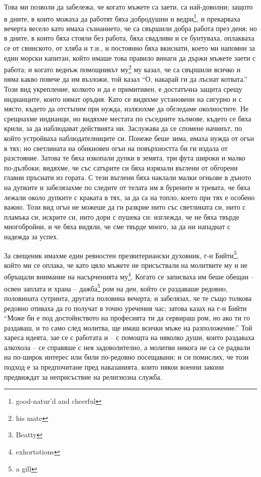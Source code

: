 \documentclass[12pt]{book}
\begin{document}
Това ми позволи да забележа, че когато мъжете са заети, са най-доволни; защото в дните, в които можаха да работят бяха добродушни и ведри\footnote{good-natur'd and cheerful}, и прекарваха вечерта весело като имаха съзнанието, че са свършили добра работа през деня; но в дните, в които бяха стояли без работа, бяха свадливи и се бунтуваха, оплакваха се от свинското, от хляба и т.н., и постоянно бяха вкиснати, което ми напомни за един морски капитан, който имаше това правило винаги да държи мъжете заети с работа; и когато веднъж помощникът му\footnote{his mate} му казал, че са свършили всичко и няма какво повече да им възложи, той казал “О, накарай ги да лъснат котвата.”  
Този вид укрепление, колкото и да е примитивен, е достатъчна защита срещу индианците, които нямат оръдия. Като се видяхме установени на сигурно и с място, където да отстъпим при нужда, излязохме да обгледаме околностите. Не срещнахме индианци, но видяхме местата по съседните хълмове, където се бяха крили, за да наблюдават действията ни. Заслужава да се спомене начинът, по който устройваха наблюдателниците си. Понеже беше зима, имаха нужда от огън в тях; но светлината на обикновен огън на повърхността би ги издала от разстояние. Затова те бяха изкопали дупки в земята, три фута широки и малко по-дълбоки; видяхме, че със сатърите си бяха изрязали въглени от обгорени главни пръснати из гората. С тези въглени бяха наклали малки огньове в дъното на дупките и забелязахме по следите от телата им в бурените и тревата, че бяха лежали около дупките с краката в тях, за да са на топло, което при тях е особено важно. Този вид огън не можеше да ги разкрие нито със светлината си, нито с пламъка си, искрите си, нито дори с пушека си: изглежда, че не бяха твърде многобройни, и че бяха видяли, че сме твърде много, за да ни нападнат с надежда за успех. 

За свещеник имахме един ревностен презвитериански духовник, г-н Бийти\footnote{Beatty}, който ми се оплака, че като цяло мъжете не присъствали на молитвите му и не обръщали внимание на насърченията му\footnote{exhortations}. Когато се записваха им беше обещан – освен заплата и храна – дажба\footnote{a gill} ром на ден, който се раздаваше редовно, половината сутринта, другата половина вечерта; и забелязах, че те също толкова редовно отиваха да го получат в точно уречения час; затова казах на г-н Бийти “Може би е под достойнството на професията ти да сервираш ром, но ако ти го раздаваш, и то само след молитва, ще имаш всички мъже на разположение.” Той хареса идеята, зае се с работата и – с помощта на няколко души, които раздаваха алкохола – се справяше с нея задоволително, а молитви никога не са се радвали на по-широк интерес или били по-редовно посещавани; и си помислих, че този подход е за предпочитане пред наказанията, които някои военни закони предвиждат за неприсъствие на религиозна служба.
\end{document}
